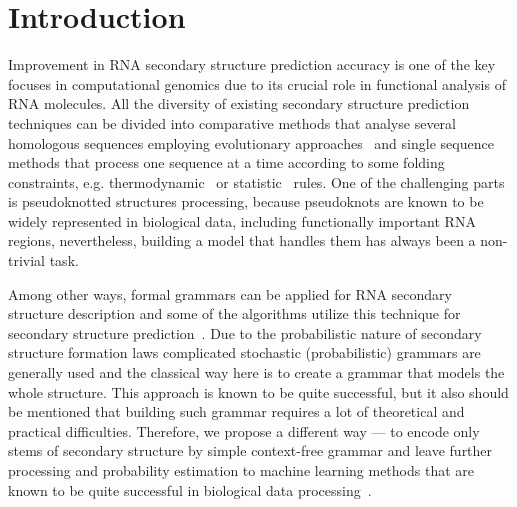 \documentclass[runningheads]{llncs}
\begin{document}
\section{Introduction}
Improvement in RNA secondary structure prediction accuracy is one of the key focuses in computational genomics due to its crucial role in functional analysis of RNA molecules. All the diversity of existing secondary structure prediction techniques can be divided into comparative methods that analyse several homologous sequences employing evolutionary approaches~\cite{hofacker1999automatic,tahi2002automatic} and single sequence methods that process one sequence at a time according to some folding constraints, e.g. thermodynamic~\cite{hamada2009prediction} or statistic~\cite{eddy1994rna,do2006contrafold} rules. One of the challenging parts is pseudoknotted structures processing, because pseudoknots are known to be widely represented in biological data, including functionally important RNA regions, nevertheless, building a model that handles them has always been a non-trivial task.

Among other ways, formal grammars can be applied for RNA secondary structure description and some of the algorithms utilize this technique for secondary structure prediction~\cite{knudsen2003pfold,nebel2011evaluation}. Due to the probabilistic nature of secondary structure formation laws complicated stochastic (probabilistic) grammars are generally used and the classical way here is to create a grammar that models the whole structure. This approach is known to be quite successful, but it also should be mentioned that building such grammar requires a lot of theoretical and practical difficulties. Therefore, we propose a different way --- to encode only stems of secondary structure by simple context-free grammar and leave further processing and probability estimation to machine learning methods that are known to be quite successful in biological data processing~\cite{higashi2009bacteria,sherman2017humidor}. 
\end{document}
